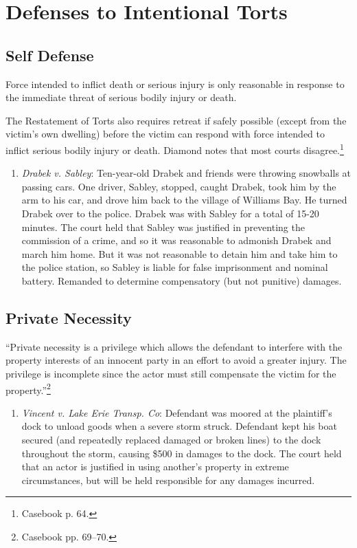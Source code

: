 \section{Defenses to Intentional Torts}

\subsection{Self Defense}

Force intended to inflict death or serious injury is only reasonable in response to the immediate threat of serious bodily injury or death.

The Restatement of Torts also requires retreat if safely possible (except from the victim's own dwelling) before the victim can respond with force intended to inflict serious bodily injury or death. Diamond notes that most courts disagree.\footnote{Casebook p. 64.}

\begin{enumerate}
    \item \emph{Drabek v. Sabley}: Ten-year-old Drabek and friends were throwing snowballs at passing cars. One driver, Sabley, stopped, caught Drabek, took him by the arm to his car, and drove him back to the village of Williams Bay. He turned Drabek over to the police. Drabek was with Sabley for a total of 15-20 minutes. The court held that Sabley was justified in preventing the commission of a crime, and so it was reasonable to admonish Drabek and march him home. But it was not reasonable to detain him and take him to the police station, so Sabley is liable for false imprisonment and nominal battery. Remanded to determine compensatory (but not punitive) damages.
\end{enumerate}

\subsection{Private Necessity}

``Private necessity is a privilege which allows the defendant to interfere with the property interests of an innocent party in an effort to avoid a greater injury. The privilege is incomplete since the actor must still compensate the victim for the property.''\footnote{Casebook pp. 69--70.}

\begin{enumerate}
    \item \emph{Vincent v. Lake Erie Transp. Co}: Defendant was moored at the plaintiff's dock to unload goods when a severe storm struck. Defendant kept his boat secured (and repeatedly replaced damaged or broken lines) to the dock throughout the storm, causing \$500 in damages to the dock. The court held that an actor is justified in using another's property in extreme circumstances, but will be held responsible for any damages incurred.
\end{enumerate}

